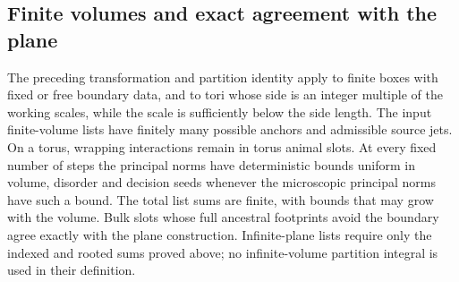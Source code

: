 \subsection{Finite volumes and exact agreement with the plane}

\begin{proposition}
\label{block:finite}
The preceding transformation and partition identity apply to finite
boxes with fixed or free boundary data, and to tori whose side is
an integer multiple of the working scales, while the scale is
sufficiently below the side length.  The input finite-volume lists
have finitely many possible anchors and admissible source jets.
On a torus, wrapping interactions remain in torus animal slots.  At
every fixed number of steps the principal norms have deterministic
bounds uniform in volume, disorder and decision seeds whenever the
microscopic principal norms have such a bound.  The total list sums
are finite, with bounds that may grow with the volume.  Bulk slots whose
full ancestral footprints avoid the boundary agree exactly with the
plane construction.  Infinite-plane lists require only the indexed
and rooted sums proved above; no infinite-volume partition integral
is used in their definition.
\end{proposition}

